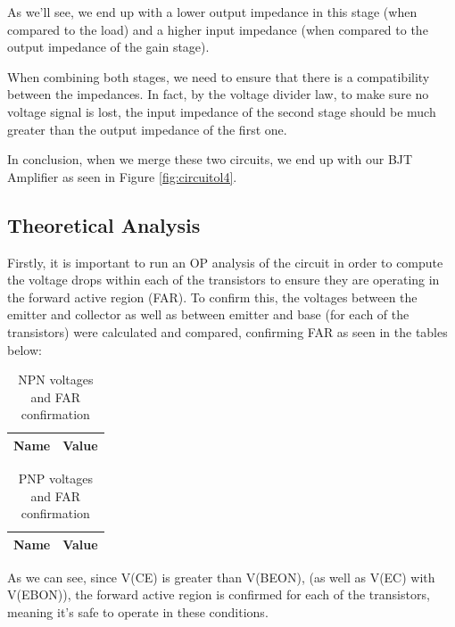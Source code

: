 As we'll see, we end up with a lower output impedance in this stage (when compared to the load) and a higher input impedance (when compared to the output impedance of the gain stage).

When combining both stages, we need to ensure that there is a compatibility  between the impedances. In fact, by the voltage divider law, to make sure no voltage signal is lost, the input impedance of the second stage should be much greater than the output impedance of the first one. 

In conclusion, when we merge these two circuits, we end up with our BJT Amplifier as seen in Figure \ref{fig:circuitol4}.

\clearpage
\subsection{Theoretical Analysis}
\label{subsec:Theo}

Firstly, it is important to run an OP analysis of the circuit in order to compute the voltage drops within each of the transistors to ensure they are operating in the forward active region (FAR). To confirm this, the voltages between the emitter and collector as well as between emitter and base (for each of the transistors) were calculated and compared, confirming FAR as seen in the tables below:

\begin{table}[h]
    \centering
    \begin{tabular}{|c|c|}
    \hline
    {\bf Name} & {\bf Value} \\ \hline
    
    \end{tabular}
    \caption{NPN voltages and FAR confirmation}
    \label{tab:theo_NPN}
\end{table}

\begin{table}[h]
    \centering
    \begin{tabular}{|c|c|}
    \hline
    {\bf Name} & {\bf Value} \\ \hline
    
    \end{tabular}
    \caption{PNP voltages and FAR confirmation}
    \label{tab:theo_PNP}
\end{table}

As we can see, since V(CE) is greater than V(BEON), (as well as V(EC) with V(EBON)), the forward active region is confirmed for each of the transistors, meaning it's safe to operate in these conditions.

